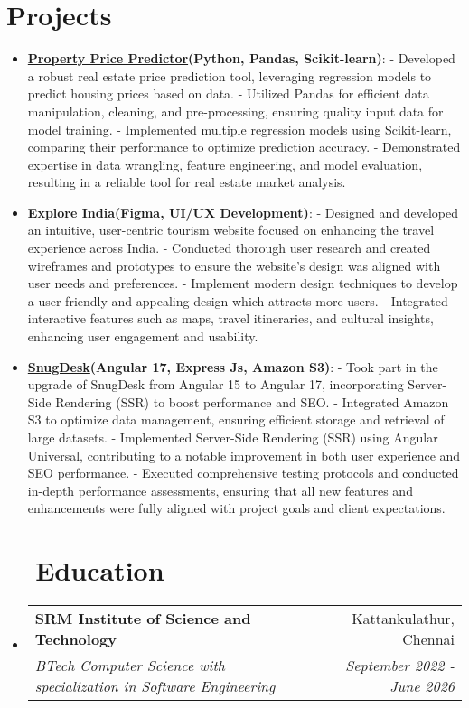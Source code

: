\documentclass[a4paper,22pt]{article}
\makeatletter
\newcommand{\resumeItem}[2]{
  \item\small{
    \textbf{#1}{: #2 \vspace{-2pt}}
  }
}
\newcommand{\resumeSubheading}[4]{
  \vspace{-1pt}\item
    \begin{tabular*}{0.97\textwidth}{l@{\extracolsep{\fill}}r}
      \textbf{#1} & #2 \\
      \textit{#3} & \textit{#4} \\
    \end{tabular*}\vspace{-5pt}
}
\newcommand{\resumeSubItem}[2]{\resumeItem{#1}{#2}\vspace{-3pt}}
\newcommand{\resumeSubHeadingListStart}{\begin{itemize}[leftmargin=*]}
\newcommand{\resumeSubHeadingListEnd}{\end{itemize}}
\makeatother
\begin{document}
\section{Projects}
\resumeSubHeadingListStart
\resumeSubItem{\href{https://github.com/RakshitYadav09/price-predictor}{Property Price Predictor}(Python, Pandas, Scikit-learn)}{ \newline
    - Developed a robust real estate price prediction tool, leveraging regression models to predict housing prices based on data. \newline
        - Utilized Pandas for efficient data manipulation, cleaning, and pre-processing, ensuring quality input data for model training.\newline
    - Implemented multiple regression models using Scikit-learn, comparing their performance to optimize prediction accuracy.\newline
    - Demonstrated expertise in data wrangling, feature engineering, and model evaluation, resulting in a reliable tool for real estate market analysis. }
\vspace{2pt}
\resumeSubItem{\href{https://www.behance.net/gallery/201845335/Explore-India-A-traveling-website-inspired-by-India/modules/1144905721}{Explore India}(Figma, UI/UX Development)}{\newline 
     - Designed and developed an intuitive, user-centric tourism website focused on enhancing the travel experience across India. \newline
        - Conducted thorough user research and created wireframes and prototypes to ensure the website’s design was aligned with user needs and preferences.\newline
    - Implement modern design techniques to develop a user friendly and appealing design which attracts more users.\newline
    - Integrated interactive features such as maps, travel itineraries, and cultural insights, enhancing user engagement and usability. }
\vspace{2pt}
\resumeSubItem{\href{https://www-dev.snugdesk.com/}{SnugDesk}(Angular 17, Express Js, Amazon S3)}{\newline 
    - Took part in the upgrade of SnugDesk from Angular 15 to Angular 17, incorporating Server-Side Rendering (SSR) to boost performance and SEO.\newline
    - Integrated Amazon S3 to optimize data management, ensuring efficient storage and retrieval of large datasets.
\newline
    - Implemented Server-Side Rendering (SSR) using Angular Universal, contributing to a notable improvement in both user experience and SEO performance.\newline
   - Executed comprehensive testing protocols and conducted in-depth performance assessments, ensuring that all new features and enhancements were fully aligned with project goals and client expectations.   }
\vspace{2pt}
\resumeSubHeadingListEnd
\section{~~Education}
  \resumeSubHeadingListStart
    \resumeSubheading
      {SRM Institute of Science and Technology}{Kattankulathur, Chennai}
      {BTech Computer Science with specialization in Software Engineering}{September 2022 - June 2026}
    \resumeSubHeadingListEnd
\end{document}
